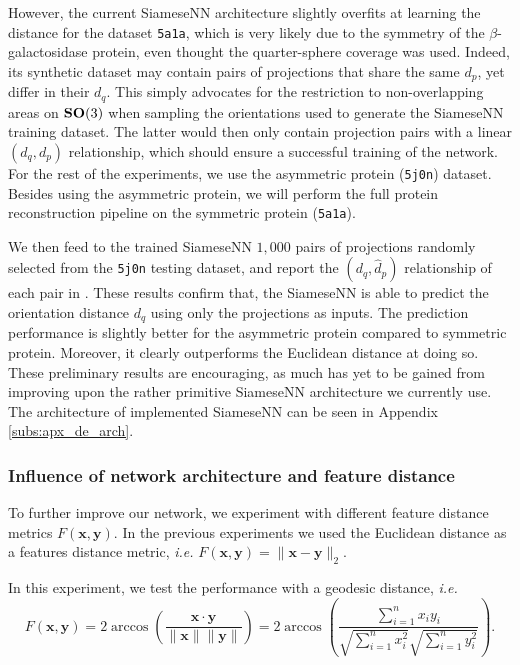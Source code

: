 However, the current SiameseNN architecture slightly overfits at learning the distance for the dataset \texttt{5a1a}, which is very likely due to the symmetry of the $\beta$-galactosidase protein, even thought the quarter-sphere coverage was used.
Indeed, its synthetic dataset may contain pairs of projections that share the same $d_p$, yet differ in their $d_q$.
This simply advocates for the restriction to non-overlapping areas on $\mathrm{\mathbf{SO}}(3)$ when sampling the orientations used to generate the SiameseNN training dataset.
The latter would then only contain projection pairs with a linear $(d_q,d_p)$ relationship, which should ensure a successful training of the network.
For the rest of the experiments, we use the asymmetric protein (\texttt{5j0n}) dataset. Besides using the asymmetric protein, we will perform the full protein reconstruction pipeline on the symmetric protein (\texttt{5a1a}).

We then feed to the trained SiameseNN $1,000$ pairs of projections randomly selected from the \texttt{5j0n} testing dataset, and report the $(d_q,\widehat{d}_p)$ relationship of each pair in .
These results confirm that, the SiameseNN is able to predict the orientation distance $d_q$ using only the projections as inputs. The prediction performance is slightly better for the asymmetric protein compared to symmetric protein.
Moreover, it clearly outperforms the Euclidean distance at doing so.
These preliminary results are encouraging, as much has yet to be gained from improving upon the rather primitive SiameseNN architecture we currently use. The architecture of implemented SiameseNN can be seen in Appendix \ref{subs:apx_de_arch}.

\subsubsection{Influence of network architecture and feature distance}


To further improve our network, we experiment with different feature distance metrics $F(\mathbf{x},\mathbf{y})$.
In the previous experiments we used the Euclidean distance as a features distance metric, \textit{i.e.} $F(\mathbf{x},\mathbf{y})=\lVert \mathbf{x}-\mathbf{y}\rVert_2$.

In this experiment, we test the performance with a geodesic distance, \textit{i.e.}
\begin{equation}
    F(\mathbf{x},\mathbf{y})=2 \arccos(\frac{\mathbf{x} \cdot \mathbf{y}}{\lVert \mathbf{x} \rVert \lVert \mathbf{y} \rVert}) = 2 \arccos(\frac{\sum_{i=1}^n x_i y_i}{\sqrt{\sum_{i=1}^n x_i^2}\sqrt{\sum_{i=1}^n y_i^2 }}).
    \label{eqn:geodesic-distance}
\end{equation}

